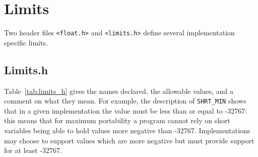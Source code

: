   

 
        \section{Limits}
        

  

  Two header files \texttt{<float.h>} and
   \texttt{<limits.h>} define several implementation specific
   limits.


  \subsection{Limits.h}
   

   Table~\ref{tab:limits_h} gives the names declared, the allowable values,
    and a comment on what they mean.  For example, the
    description of \texttt{SHRT\_MIN} shows that in a given implementation
    the value must be less than or equal to -32767: this means
    that for maximum portability a program cannot rely on short
    variables being able to hold values more negative than
    -32767.  Implementations may choose to support values which
    are more negative but must provide support for at least
    -32767.


